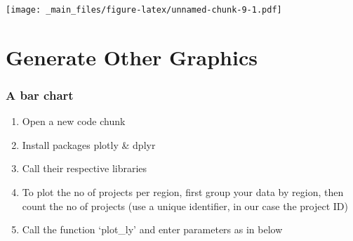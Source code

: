 \documentclass[
]{book}
\newenvironment{Shaded}{\begin{snugshade}}{\end{snugshade}}
\newcommand{\AttributeTok}[1]{\textcolor[rgb]{0.77,0.63,0.00}{#1}}
\newcommand{\DecValTok}[1]{\textcolor[rgb]{0.00,0.00,0.81}{#1}}
\newcommand{\FunctionTok}[1]{\textcolor[rgb]{0.00,0.00,0.00}{#1}}
\newcommand{\NormalTok}[1]{#1}
\newcommand{\OtherTok}[1]{\textcolor[rgb]{0.56,0.35,0.01}{#1}}
\newcommand{\SpecialCharTok}[1]{\textcolor[rgb]{0.00,0.00,0.00}{#1}}
\newcommand{\StringTok}[1]{\textcolor[rgb]{0.31,0.60,0.02}{#1}}
\providecommand{\tightlist}{%
  \setlength{\itemsep}{0pt}\setlength{\parskip}{0pt}}
\begin{document}
\texttt{[image: \_main\_files/figure-latex/unnamed-chunk-9-1.pdf]}

\hypertarget{generate-other-graphics}{%
\chapter{Generate Other Graphics}\label{generate-other-graphics}}

\hypertarget{a-bar-chart}{%
\subsection{A bar chart}\label{a-bar-chart}}

\begin{enumerate}
\def\labelenumi{\arabic{enumi}.}
\tightlist
\item
  Open a new code chunk
\item
  Install packages plotly \& dplyr
\item
  Call their respective libraries
\item
  To plot the no of projects per region, first group your data by region, then count the no of projects (use a unique identifier, in our case the project ID)
\item
  Call the function `plot\_ly' and enter parameters as in below
\end{enumerate}

\begin{Shaded}
\end{Shaded}
\end{document}
